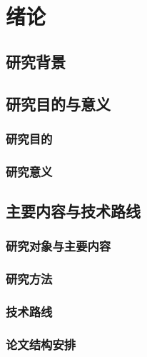 \chapter{绪论}
\label{cha:intro}

\section{研究背景}


\section{研究目的与意义}


\subsection{研究目的}

\subsection{研究意义}

\section{主要内容与技术路线}

\subsection{研究对象与主要内容}

\subsection{研究方法}

\subsection{技术路线}

\subsection{论文结构安排}




